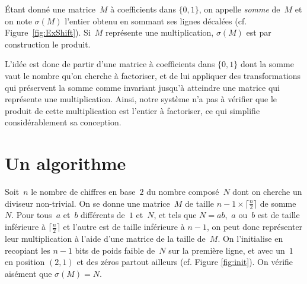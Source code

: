 
\begin{df*}
Étant donné une matrice~$M$ à coefficients dans $\{0,1\}$, on appelle \emph{somme} de~$M$ et on note $\sigma (M)$ l'entier obtenu en sommant ses lignes décalées (cf. Figure~\ref{fig:ExShift}). Si~$M$ représente une multiplication, $\sigma(M)$ est par construction le produit. 
\end{df*}



L'idée est donc de partir d'une matrice à coefficients dans $\{0,1\}$ dont la somme vaut le nombre qu'on cherche à factoriser, et de lui appliquer des transformations qui préservent la somme comme invariant jusqu'à atteindre une matrice qui représente une multiplication. Ainsi, notre système n'a pas à vérifier que le produit de cette multiplication est l'entier à factoriser, ce qui simplifie considérablement sa conception.

\section{Un algorithme}

Soit~$n$ le nombre de chiffres en base~$2$ du nombre composé~$N$ dont on cherche un diviseur non-trivial. On se donne une matrice~$M$ de taille $ n-1 \times \lceil \frac{n}{2}\rceil$ de somme~$N$. Pour tous~$a$ et~$b$ différents de~$1$ et~$N$, et tels que $N = ab$,~$a$ ou~$b$ est de taille inférieure à $\lceil\frac{n}{2}\rceil$ et l'autre est de taille inférieure à $n-1$, on peut donc représenter leur multiplication à l'aide d'une matrice de la taille de~$M$. On l'initialise en recopiant les $n-1$ bits de poids faible de~$N$ sur la première ligne, et avec un~$1$ en position $(2,1)$ et des zéros partout ailleurs (cf. Figure \ref{fig:init}). On vérifie aisément que $\sigma(M)=N$. 


